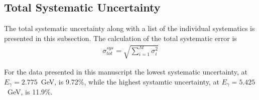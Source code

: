 \subsection{Total Systematic Uncertainty}
 	The total systematic uncertainty along with a list of the individual systematics is presented in this subsection. The calculation of the total systematic error is 
 	\begin{align}
 		\sigma^{sys}_{tot} = \sqrt{\sum_{i=1}^{M}\sigma_i^2}
 	\end{align}
 	
 	For the data presented in this manuscript the lowest systematic uncertainty, at $E_\gamma = 2.775$~GeV, is 9.72\%, while the highest systamtic uncertainty, at $E_\gamma = 5.425$~GeV, is 11.9\%.
